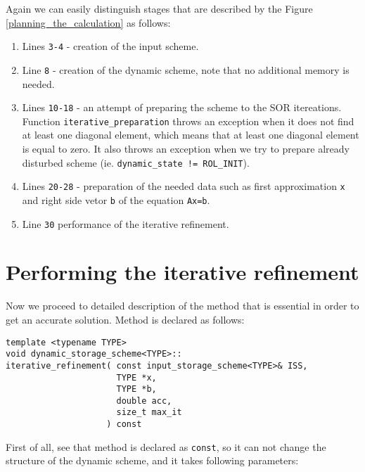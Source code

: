 Again we can easily distinguish stages that are described by the Figure \ref{planning_the_calculation} as follows:

\begin{enumerate}
	\item Lines \texttt{3-4} - creation of the input scheme.
	\item Line \texttt{8} - creation of the dynamic scheme, note that no additional memory is needed.
	\item Lines \texttt{10-18} - an attempt of preparing the scheme to the SOR itereations. Function \texttt{iterative\_preparation} throws an exception when it does not find at least one diagonal element, which means that at least one diagonal element is equal to zero. It also throws an exception when we try to prepare already disturbed scheme (ie. \texttt{dynamic\_state != ROL\_INIT}).
	\item Lines \texttt{20-28} - preparation of the needed data such as first approximation \texttt{x} and right side vetor \texttt{b} of the equation \texttt{Ax=b}.
	\item Line \texttt{30} performance of the iterative refinement.
\end{enumerate}

\section{Performing the iterative refinement}
Now we proceed to detailed description of the method   that is essential in order to get an accurate solution. Method is declared as follows:

\begin{verbatim}
template <typename TYPE>
void dynamic_storage_scheme<TYPE>::
iterative_refinement( const input_storage_scheme<TYPE>& ISS,
                      TYPE *x,
                      TYPE *b,
                      double acc,
                      size_t max_it
                    ) const
\end{verbatim}

First of all, see that method is declared as \texttt{const}, so it can not change the structure of the dynamic scheme, and it takes following parameters:

